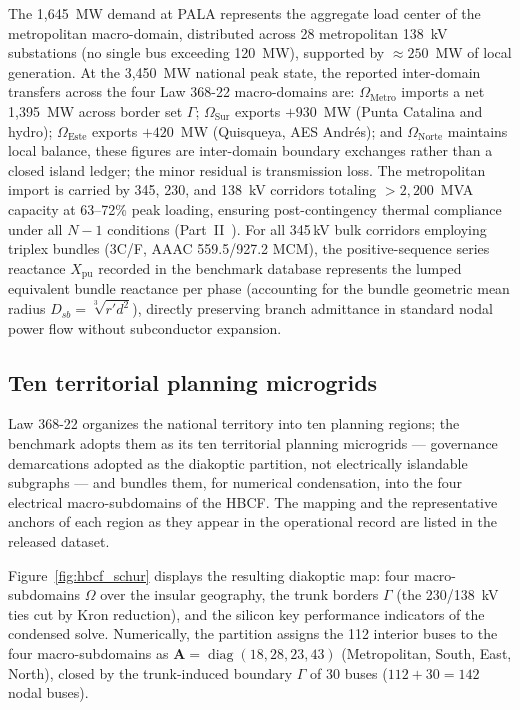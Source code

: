 The 1,645~MW demand at PALA represents the aggregate load center of the metropolitan macro-domain, distributed across 28 metropolitan 138~kV substations (no single bus exceeding 120~MW), supported by $\approx 250$~MW of local generation. At the 3,450~MW national peak state, the reported inter-domain transfers across the four Law 368-22 macro-domains are: $\Omega_{\mathrm{Metro}}$ imports a net 1,395~MW across border set $\Gamma$; $\Omega_{\mathrm{Sur}}$ exports $+930$~MW (Punta Catalina and hydro); $\Omega_{\mathrm{Este}}$ exports $+420$~MW (Quisqueya, AES Andr\'es); and $\Omega_{\mathrm{Norte}}$ maintains local balance, these figures are inter-domain boundary exchanges rather than a closed island ledger; the minor residual is transmission loss. The metropolitan import is carried by 345, 230, and 138~kV corridors totaling $>2,200$~MVA capacity at 63--72\% peak loading, ensuring post-contingency thermal compliance under all $N-1$ conditions (Part~II~\cite{seni142part2}). For all 345\,kV bulk corridors employing triplex bundles (3C/F, AAAC 559.5/927.2 MCM), the positive-sequence series reactance $X_{\mathrm{pu}}$ recorded in the benchmark database represents the lumped equivalent bundle reactance per phase (accounting for the bundle geometric mean radius $D_{sb} = \sqrt[3]{r' d^2}$), directly preserving branch admittance in standard nodal power flow without subconductor expansion.

\subsection{Ten territorial planning microgrids}
\label{sub:microgrids}

Law 368-22 organizes the national territory into ten planning regions; the benchmark adopts them as its ten territorial planning microgrids --- governance demarcations adopted as the diakoptic partition, not electrically islandable subgraphs --- and bundles them, for numerical condensation, into the four electrical macro-subdomains of the HBCF. The mapping and the representative anchors of each region as they appear in the operational record are listed in the released dataset.

Figure~\ref{fig:hbcf_schur} displays the resulting diakoptic map: four macro-subdomains $\Omega$ over the insular geography, the trunk borders $\Gamma$ (the 230/138~kV ties cut by Kron reduction), and the silicon key performance indicators of the condensed solve. Numerically, the partition assigns the 112 interior buses to the four macro-subdomains as $\mathbf{A} = \operatorname{diag}(18, 28, 23, 43)$ (Metropolitan, South, East, North), closed by the trunk-induced boundary $\Gamma$ of 30 buses ($112 + 30 = 142$ nodal buses).

